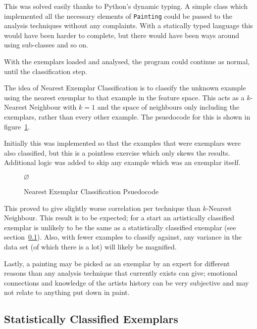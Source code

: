 This was solved easily thanks to Python's dynamic typing. A simple class which implemented all the
necessary elements of \texttt{Painting} could be passed to the analysis techniques without any
complaints. With a statically typed language this would have been harder to complete, but there
would have been ways around using sub-classes and so on.

With the exemplars loaded and analysed, the program could continue as normal, until the
classification step.

The idea of Nearest Exemplar Classification is to classify the unknown example using the nearest
exemplar to that example in the feature space. This acts as a $k$-Nearest Neighbour with $k=1$ and
the space of neighbours only including the exemplars, rather than every other example. The 
psuedocode for this is shown in figure~\ref{fig:nec-psuedo}.

Initially this was implemented so that the examples that were exemplars were also classified, but
this is a pointless exercise which only skews the results. Additional logic was added to skip any
example which was an exemplar itself.

\begin{figure}[h]
\begin{algorithmic}
\State \Return $\varnothing$
\EndIf
\State \Return {}
\EndFunction
\end{algorithmic}
\caption{Nearest Exemplar Classification Psuedocode}\label{fig:nec-psuedo}
\end{figure}

This proved to give slightly worse correlation per technique than $k$-Nearest Neighbour. This 
result is to be expected; for a start an artistically classified exemplar is unlikely to be the
same as a statistically classified exemplar (see section~\ref{sec:sce}). Also, with fewer examples
to classify against, any variance in the data set (of which there is a lot) will likely be 
magnified.

Lastly, a painting may be picked as an exemplar by an expert for different reasons than any
analysis technique that currently exists can give; emotional connections and knowledge of the
artists history can be very subjective and may not relate to anything put down in paint.


\subsection{Statistically Classified Exemplars}\label{sec:sce}

